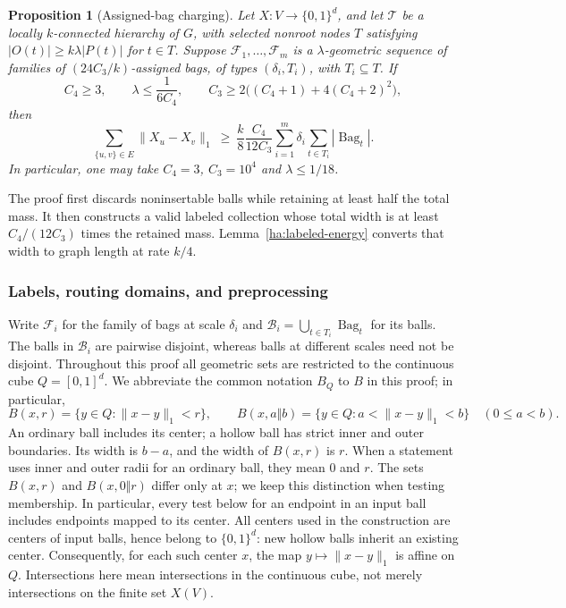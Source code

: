 \documentclass[11pt]{amsart}
\newtheorem{proposition}[theorem]{Proposition}
\theoremstyle{definition}
\theoremstyle{remark}
\numberwithin{equation}{section}
\begin{document}
\begin{proposition}[Assigned-bag charging]
\label{prop:hierarchy-assigned}
Let $X:V\to\{0,1\}^{d}$, and let $\mathcal T$ be a locally
$k$-connected hierarchy of $G$, with selected nonroot nodes $T$ satisfying
$|O(t)|\ge k\lambda|P(t)|$ for $t\in T$.
Suppose $\mathcal F_1,\ldots,\mathcal F_m$ is a $\lambda$-geometric
sequence of families of $(24C_3/k)$-assigned bags, of types
$(\delta_i,T_i)$, with $T_i\subseteq T$.  If
\[
 C_4\ge3,\qquad \lambda\le\frac1{6C_4},\qquad
 C_3\ge2\bigl((C_4+1)+4(C_4+2)^2\bigr),
\]
then
\begin{equation}\label{ha:assigned-bound}
 \sum_{\{u,v\}\in E}\|X_u-X_v\|_1
 \ \ge\ \frac{k}{8}\frac{C_4}{12C_3}
 \sum_{i=1}^m\delta_i\sum_{t\in T_i}|\operatorname{Bag}_t|.
\end{equation}
In particular, one may take $C_4=3$, $C_3=10^4$ and
$\lambda\le1/18$.
\end{proposition}

The proof first discards noninsertable balls while retaining at least
half the total mass. It then constructs a valid labeled collection
whose total width is at least $C_4/(12C_3)$ times the retained mass.
Lemma~\ref{ha:labeled-energy} converts that width to graph length
at rate $k/4$.

\subsubsection{Labels, routing domains, and preprocessing}
\label{ha:preprocessing}

Write $\mathcal F_i$ for the family of bags at scale $\delta_i$ and
$\mathcal B_i=\bigcup_{t\in T_i}\operatorname{Bag}_t$ for its balls.
The balls in $\mathcal B_i$ are pairwise disjoint, whereas balls at
different scales need not be disjoint.  Throughout this proof all
geometric sets are restricted to the continuous cube $Q=[0,1]^d$.
We abbreviate the common notation $B_Q$ to $B$ in this proof; in particular,
\[
 B(x,r)=\{y\in Q:\|x-y\|_1<r\},\qquad
 B(x,a\Vert b)=\{y\in Q:a<\|x-y\|_1<b\}
 \quad(0\le a<b).
\]
An ordinary ball includes its center; a hollow ball has strict inner
and outer boundaries.  Its width is $b-a$, and the width of $B(x,r)$
is $r$.  When a statement uses inner and outer radii for an ordinary
ball, they mean $0$ and $r$.  The sets $B(x,r)$ and
$B(x,0\Vert r)$ differ only at $x$; we keep this distinction when
testing membership.  In particular, every test below for an endpoint
in an input ball includes endpoints mapped to its center.
All centers used in the construction are centers of input balls, hence
belong to $\{0,1\}^d$: new hollow balls inherit an existing center.
Consequently, for each such center $x$, the map $y\mapsto\|x-y\|_1$
is affine on $Q$.  Intersections here mean intersections in the
continuous cube, not merely intersections on the finite set $X(V)$.
\end{document}
